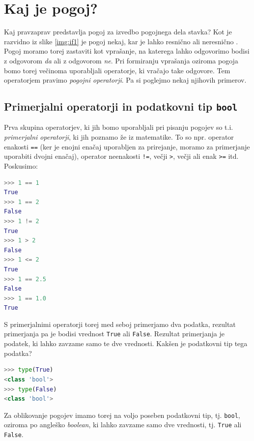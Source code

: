 \section{Kaj je pogoj?}

Kaj pravzaprav predstavlja pogoj za izvedbo pogojnega dela stavka? Kot je razvidno iz slike \ref{img:if1} je pogoj nekaj, kar je lahko resnično  ali neresnično . Pogoj moramo torej zastaviti kot vprašanje, na katerega lahko odgovorimo bodisi z odgovorom \emph{da} ali z odgovorom \emph{ne}. Pri formiranju vprašanja oziroma pogoja bomo torej večinoma uporabljali operatorje, ki vračajo take odgovore. Tem operatorjem pravimo \emph{pogojni operatorji}. Pa si poglejmo nekaj njihovih primerov.

\subsection{Primerjalni operatorji in podatkovni tip \texttt{bool}}

Prva skupina operatorjev, ki jih bomo uporabljali pri pisanju pogojev so t.i. \emph{primerjalni operatorji}, ki jih poznamo že iz matematike. To so npr. operator enakosti \texttt{==} (ker je enojni enačaj uporabljen za prirejanje, moramo za primerjanje uporabiti dvojni enačaj), operator neenakosti \texttt{!=}, večji \texttt{>}, večji ali enak \texttt{>=} itd. Poskusimo:
\begin{lstlisting}[language=Python]
>>> 1 == 1
True
>>> 1 == 2
False
>>> 1 != 2
True
>>> 1 > 2
False
>>> 1 <= 2
True
>>> 1 == 2.5
False
>>> 1 == 1.0
True
\end{lstlisting}
S primerjalnimi operatorji torej med seboj primerjamo dva podatka, rezultat primerjanja pa je bodisi vrednost \texttt{True} ali \texttt{False}. Rezultat primerjanja je podatek, ki lahko zavzame samo te dve vrednosti. Kakšen je podatkovni tip tega podatka?
\begin{lstlisting}[language=Python]
>>> type(True)
<class 'bool'>
>>> type(False)
<class 'bool'>
\end{lstlisting}
Za oblikovanje pogojev imamo torej na voljo poseben podatkovni tip, tj. \texttt{bool}, oziroma po angleško \emph{boolean}, ki lahko zavzame samo dve vrednosti, tj. \texttt{True} ali \texttt{False}. 

